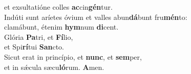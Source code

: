 \oddverse et exsultatióne colles \textbf{ac}cin\textbf{gén}tur.\\
\evenverse Indúti sunt aríetes óvium et valles abun\textbf{dá}bunt fru\textbf{mén}to:~\*\\
\evenverse clamábunt, étenim \textbf{hym}num \textbf{di}cent.\\
\oddverse Glória \textbf{Pa}tri, et \textbf{Fí}lio,~\*\\
\oddverse et Spi\textbf{rí}tui \textbf{San}cto.\\
\evenverse Sicut erat in princípio, et \textbf{nunc}, et \textbf{sem}per,~\*\\
\evenverse et in sǽcula sæcu\textbf{ló}rum. \textbf{A}men.\\
